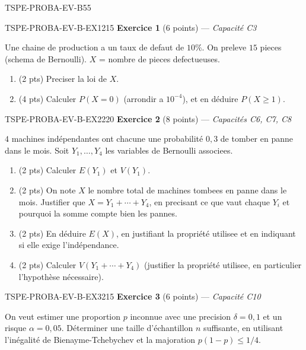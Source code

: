 \begin{evaluation}{TSPE-PROBA-EV-B}{55}

\begin{exercice}{TSPE-PROBA-EV-B-EX1}{2}{15}
\textbf{Exercice 1} (6 points) — \textit{Capacité C3}

\medskip

Une chaine de production a un taux de defaut de $10\%$. On preleve $15$ pieces (schema de Bernoulli). $X$ = nombre de pieces defectueuses.
\begin{enumerate}
  \item (2 pts) Preciser la loi de $X$.
  \item (4 pts) Calculer $P(X=0)$ (arrondir a $10^{-4}$), et en déduire $P(X\geq 1)$.
\end{enumerate}
\end{exercice}

\begin{exercice}{TSPE-PROBA-EV-B-EX2}{2}{20}
\textbf{Exercice 2} (8 points) — \textit{Capacités C6, C7, C8}

\medskip

$4$ machines indépendantes ont chacune une probabilité $0{,}3$ de tomber en panne dans le mois. Soit $Y_1,\ldots,Y_4$ les variables de Bernoulli associees.
\begin{enumerate}
  \item (2 pts) Calculer $E(Y_1)$ et $V(Y_1)$.
  \item (2 pts) On note $X$ le nombre total de machines tombees en panne dans le mois. Justifier que $X=Y_1+\cdots+Y_4$, en precisant ce que vaut chaque $Y_i$ et pourquoi la somme compte bien les pannes.
  \item (2 pts) En déduire $E(X)$, en justifiant la propriété utilisee et en indiquant si elle exige l'indépendance.
  \item (2 pts) Calculer $V(Y_1+\cdots+Y_4)$ (justifier la propriété utilisee, en particulier l'hypothèse nécessaire).
\end{enumerate}
\end{exercice}

\begin{exercice}{TSPE-PROBA-EV-B-EX3}{2}{15}
\textbf{Exercice 3} (6 points) — \textit{Capacité C10}

\medskip

On veut estimer une proportion $p$ inconnue avec une precision $\delta=0{,}1$ et un risque $\alpha=0{,}05$. Déterminer une taille d'échantillon $n$ suffisante, en utilisant l'inégalité de Bienayme-Tchebychev et la majoration $p(1-p)\leq 1/4$.
\end{exercice}

\end{evaluation}
